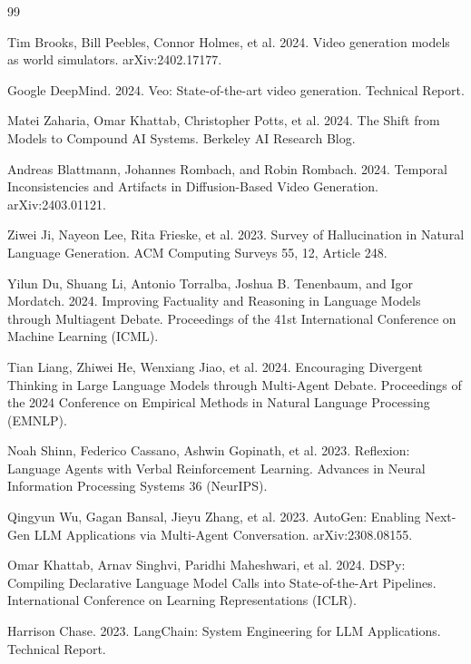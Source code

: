 \documentclass[sigconf,authordraft]{acmart}
\begin{document}
\begin{thebibliography}{99}

Tim Brooks, Bill Peebles, Connor Holmes, et al. 2024. Video generation models as world simulators. arXiv:2402.17177.

Google DeepMind. 2024. Veo: State-of-the-art video generation. Technical Report.

Matei Zaharia, Omar Khattab, Christopher Potts, et al. 2024. The Shift from Models to Compound AI Systems. Berkeley AI Research Blog.

Andreas Blattmann, Johannes Rombach, and Robin Rombach. 2024. Temporal Inconsistencies and Artifacts in Diffusion-Based Video Generation. arXiv:2403.01121.

Ziwei Ji, Nayeon Lee, Rita Frieske, et al. 2023. Survey of Hallucination in Natural Language Generation. ACM Computing Surveys 55, 12, Article 248.

Yilun Du, Shuang Li, Antonio Torralba, Joshua B. Tenenbaum, and Igor Mordatch. 2024. Improving Factuality and Reasoning in Language Models through Multiagent Debate. Proceedings of the 41st International Conference on Machine Learning (ICML).

Tian Liang, Zhiwei He, Wenxiang Jiao, et al. 2024. Encouraging Divergent Thinking in Large Language Models through Multi-Agent Debate. Proceedings of the 2024 Conference on Empirical Methods in Natural Language Processing (EMNLP).

Noah Shinn, Federico Cassano, Ashwin Gopinath, et al. 2023. Reflexion: Language Agents with Verbal Reinforcement Learning. Advances in Neural Information Processing Systems 36 (NeurIPS).

Qingyun Wu, Gagan Bansal, Jieyu Zhang, et al. 2023. AutoGen: Enabling Next-Gen LLM Applications via Multi-Agent Conversation. arXiv:2308.08155.

Omar Khattab, Arnav Singhvi, Paridhi Maheshwari, et al. 2024. DSPy: Compiling Declarative Language Model Calls into State-of-the-Art Pipelines. International Conference on Learning Representations (ICLR).

Harrison Chase. 2023. LangChain: System Engineering for LLM Applications. Technical Report.


\end{thebibliography}
\end{document}
